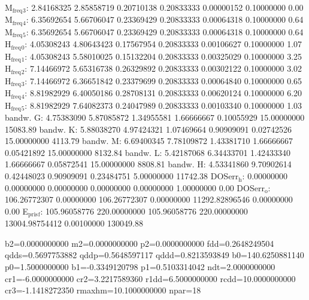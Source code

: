 \documentclass[11pt]{article}
\begin{document}
M\(_{\text{freq}}\)\(_{\text{3}}\):   2.84168325   2.85858719   0.20710138   0.20833333   0.00000152   0.10000000         0.00
M\(_{\text{freq}}\)\(_{\text{4}}\):   6.35692654   5.66706047   0.23369429   0.20833333   0.00064318   0.10000000         0.64
M\(_{\text{freq}}\)\(_{\text{5}}\):   6.35692654   5.66706047   0.23369429   0.20833333   0.00064318   0.10000000         0.64
H\(_{\text{freq}}\)\(_{\text{0}}\):   4.05308243   4.80643423   0.17567954   0.20833333   0.00106627   0.10000000         1.07
H\(_{\text{freq}}\)\(_{\text{1}}\):   4.05308243   5.58010025   0.15132204   0.20833333   0.00325029   0.10000000         3.25
H\(_{\text{freq}}\)\(_{\text{2}}\):   7.14466972   5.65316738   0.26329892   0.20833333   0.00302122   0.10000000         3.02
H\(_{\text{freq}}\)\(_{\text{3}}\):   7.14466972   6.36651842   0.23379699   0.20833333   0.00064840   0.10000000         0.65
H\(_{\text{freq}}\)\(_{\text{4}}\):   8.81982929   6.40050186   0.28708131   0.20833333   0.00620124   0.10000000         6.20
H\(_{\text{freq}}\)\(_{\text{5}}\):   8.81982929   7.64082373   0.24047989   0.20833333   0.00103340   0.10000000         1.03
bandw. G:   4.75383090   5.87085872   1.34955581   1.66666667   0.10055929  15.00000000     15083.89
bandw. K:   5.88038270   4.97424321   1.07469664   0.90909091   0.02742526  15.00000000      4113.79
bandw. M:   6.69400345   7.78109872   1.43381710   1.66666667   0.05421892  15.00000000      8132.84
bandw. L:   5.42187068   6.34433701   1.42433340   1.66666667   0.05872541  15.00000000      8808.81
bandw. H:   4.53341860   9.70902614   0.42448023   0.90909091   0.23484751   5.00000000     11742.38
DOSerr\(_{\text{h}}\):   0.00000000   0.00000000   0.00000000   0.00000000   0.00000000   1.00000000         0.00
DOSerr\(_{\text{o}}\): 106.26772307   0.00000000 106.26772307   0.00000000 11292.82896546   0.00000000         0.00
E\(_{\text{pris}}\)\(_{\text{f}}\): 105.96058776 220.00000000 105.96058776 220.00000000 13004.98754412   0.00100000    130049.88

b2=0.0000000000 m2=0.0000000000 p2=0.0000000000 fdd=0.2648249504 qdds=0.5697753882 qddp=0.5648597117 qddd=0.8213593849 b0=140.6250881140 p0=1.5000000000 b1=-0.3349120798 p1=0.5103314042 ndt=2.0000000000 cr1=-6.0000000000 cr2=3.2217589360 r1dd=6.5000000000 rcdd=10.0000000000 cr3=-1.1418272350 rmaxhm=10.1000000000 npar=18 
\end{document}
